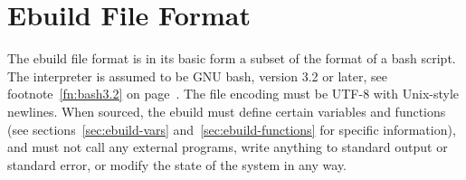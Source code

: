\chapter{Ebuild File Format}
\label{sec:ebuild-format}

The ebuild file format is in its basic form a subset of the format of a bash script. The interpreter
is assumed to be GNU bash, version 3.2 or later, see footnote~\ref{fn:bash3.2} on
page~\pageref{fn:bash3.2}. The file encoding must be UTF-8 with Unix-style newlines. When sourced,
the ebuild must define certain variables and functions (see sections~\ref{sec:ebuild-vars}
and~\ref{sec:ebuild-functions} for specific information), and must not call any external programs,
write anything to standard output or standard error, or modify the state of the system in any way.


